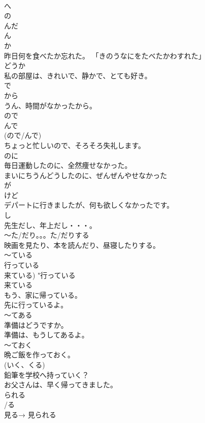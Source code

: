 \documentclass[8pt]{extreport}
\begin{document}
\begin{CJK}{UTF8}{min}
\\	へ 
\\	の 
\\	んだ 
\\	ん	
\\	か 
\\	昨日何を食べたか忘れた。 「きのうなにをたべたかわすれた」 
\\	どうか	
\\	私の部屋は、きれいで、静かで、とても好き。
\\	で 
\\	から 
\\	うん、時間がなかったから。 
\\	ので　
\\	んで	
\\	(ので/んで) 
\\	ちょっと忙しいので、そろそろ失礼します。
\\	のに	
\\	毎日運動したのに、全然痩せなかった。   
\\	まいにちうんどうしたのに、ぜんぜんやせなかった 
\\	が 
\\	けど	
\\	デパートに行きましたが、何も欲しくなかったです。 
\\	し 
\\	先生だし、年上だし・・・。 
\\	〜た/だり。。。た/だりする	
\\	映画を見たり、本を読んだり、昼寝したりする。 
\\	〜ている	
\\	行っている 
\\	来ている)	"行っている 
\\	来ている 
\\	もう、家に帰っている。
\\	先に行っているよ。 
\\	～てある	
\\	準備はどうですか。 
\\	準備は、もうしてあるよ。 
\\	〜ておく	
\\	晩ご飯を作っておく。 
\\	(いく、くる) 
\\	鉛筆を学校へ持っていく？ 
\\	お父さんは、早く帰ってきました。 
\\	られる 
\\	/る	
\\	見る→ 見られる

\end{CJK}
\end{document}
